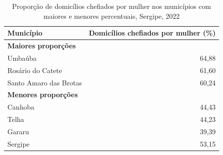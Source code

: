 \begin{table}[htbp]
\centering
\caption{Proporção de domicílios chefiados por mulher nos municípios com maiores e menores percentuais, Sergipe, 2022}
\label{tab:item2-1-chefe-mulher}
\small
\begin{tabular}{lr}
\toprule
Município & Domicílios chefiados por mulher (\%) \\
\midrule
\multicolumn{2}{l}{\textbf{Maiores proporções}} \\
Umbaúba & 64,88 \\
Rosário do Catete & 61,60 \\
Santo Amaro das Brotas & 60,24 \\
\midrule
\multicolumn{2}{l}{\textbf{Menores proporções}} \\
Canhoba & 44,43 \\
Telha & 44,23 \\
Gararu & 39,39 \\
\midrule
Sergipe & 53,15 \\
\bottomrule
\end{tabular}
\end{table}
